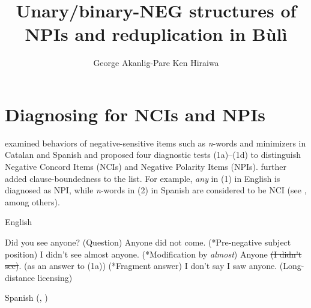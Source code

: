 \documentclass[output=paper,colorlinks,citecolor=brown]{langscibook}
\title{Unary/binary-NEG structures of NPIs and reduplication in Bùlì}
\author{%
George Akanlig-Pare\affiliation{University of Ghana, Legon}\lastand
Ken Hiraiwa\affiliation{Meiji Gakuin University}
}
\begin{document}
\maketitle 

\section{Diagnosing for NCIs and NPIs}

\cite{Vallduvi1994} examined behaviors of negative-sensitive items such as \textit{n}-words and minimizers in Catalan and Spanish and proposed four diagnostic tests (1a)--(1d) to distinguish Negative Concord Items (NCIs) and Negative Polarity Items (NPIs). \cite{Giannakidou2000} further added clause-boundedness to the list. For example, \textit{any} in (1) in English is diagnosed as NPI, while \textit{n}-words in (2) in Spanish are considered to be NCI (see \citealt{Ladusaw1979, HaegemanZanuttini1996, Haegeman1995, Watanabe2004, Giannakidou2006, GiannakidouZeijlstra2017}, among others).

\begin{exe}
\ex English
\begin{xlist}
    \ex Did you see anyone?           \hfill{(Question)}
    \ex *Anyone did not come.               \hfill{(*Pre-negative subject position)}
    \ex *I didn't see almost anyone.           \hfill{(*Modification by \textit{almost})}
    \ex *Anyone \sout{(I didn't see)}. (as an answer to (1a))      \hfill{(*Fragment answer)}
    \ex I don't say I saw anyone.            \hfill{(Long-distance licensing)}
\end{xlist}
\end{exe}

\begin{exe}

\ex Spanish (\citealt{Vallduvi1994}, \citealt{Penka2011})
\begin{xlist}
\end{xlist}
\end{exe}
\end{document}
